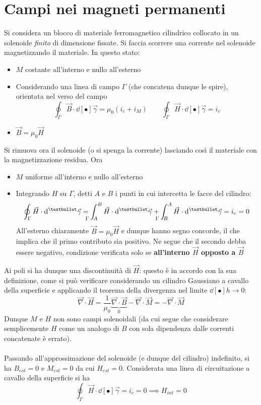 \section{Campi nei magneti permanenti}
Si considera un blocco di materiale ferromagnetico cilindrico collocato in un solenoide \textit{finito} di dimensione fissate. Si faccia scorrere una corrente nel solenoide magnetizzando il materiale. In questo stato:
\begin{itemize}
\item $M$ costante all'interno e nullo all'esterno
\item Considerando una linea di campo $\Gamma$ (che concatena dunque le spire), orientata nel verso del campo
\[\oint_\Gamma \vec{B} \cdot \dd[•]{\vec{\gamma}} = \mu_0 (i_c + i_M) \qquad \oint_\Gamma \vec{H} \cdot \dd[•]{\vec{\gamma}} = i_c\]
\item $\vec{B} = \mu_0 \vec{H}$
\end{itemize}
Si rimuova ora il solenoide (o si spenga la corrente) lasciando così il materiale con la magnetizzazione residua. Ora
\begin{itemize}
\item $M$ uniforme all'interno e nullo all'esterno
\item Integrando $H$ su $\Gamma$, detti $A$ e $B$ i punti in cui intercetta le facce del cilindro:
\[\oint_\Gamma \vec{H} \cdot \dd[•]{\vec{\gamma}} = \int_{\hspace{-0.45cm} \Gamma \hspace{0.22cm} A}^B \vec{H} \cdot \dd[•]{\vec{\gamma}} + \int_{\hspace{-0.45cm} \Gamma \hspace{0.22cm} B}^A \vec{H} \cdot \dd[•]{\vec{\gamma}} = i_c = 0\]
All'esterno chiaramente $\vec{B} = \mu_0 \vec{H}$ e dunque hanno segno concorde, il che implica che il primo contributo sia positivo. Ne segue che il secondo debba essere negativo, condizione verificata solo se \textbf{all'interno $\vec{H}$ opposto a $\vec{B}$}
\end{itemize}

Ai poli si ha dunque una discontinuità di $\vec{H}$: questo è in accordo con la sua definizione, come si può verificare considerando un cilindro Gaussiano a cavallo della superficie e applicando il teorema della divergenza nel limite $\dd[•]{h} \rightarrow 0$:
\[\vec{\nabla} \cdot \vec{H} = \frac{1}{\mu_0} \underbrace{\vec{\nabla} \cdot \vec{B}}_{0} - \vec{\nabla} \cdot \vec{M} = - \vec{\nabla} \cdot \vec{M}\]
Dunque $M$ e $H$ non sono campi solenoidali (da cui segue che considerare semplicemente $H$ come un analogo di $B$ con sola dipendenza dalle correnti concatenate è errato).
\\~\\
Passando all'approssimazione del solenoide (e dunque del cilindro) indefinito, si ha $B_{est} = 0$ e $M_{est} = 0$ da cui $H_{est} = 0$. Considerata una linea di circuitazione a cavallo della superficie si ha
\[\oint_\Gamma \vec{H} \cdot \dd[•]{\vec{\gamma}} = i_c = 0 \implies H_{int} = 0\]










